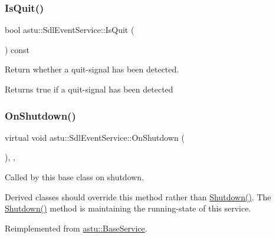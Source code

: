 \subsubsection{\texorpdfstring{Is\+Quit()}{IsQuit()}}
{\footnotesize\ttfamily bool astu\+::\+Sdl\+Event\+Service\+::\+Is\+Quit (\begin{DoxyParamCaption}{ }\end{DoxyParamCaption}) const}

Return whether a quit-\/signal has been detected.

\begin{DoxyReturn}{Returns}
{\ttfamily true} if a quit-\/signal has been detected 
\end{DoxyReturn}
\mbox{\label{classastu_1_1SdlEventService_a0163bd191605b5068d93cd6c8f26da0c}} 
\subsubsection{\texorpdfstring{On\+Shutdown()}{OnShutdown()}}
{\footnotesize\ttfamily virtual void astu\+::\+Sdl\+Event\+Service\+::\+On\+Shutdown (\begin{DoxyParamCaption}{ }\end{DoxyParamCaption})\hspace{0.3cm}{\ttfamily [override]}, {\ttfamily [protected]}, {\ttfamily [virtual]}}

Called by this base class on shutdown.

Derived classes should override this method rather than {\ttfamily \hyperlink{classastu_1_1UpdatableBaseService_a7ad7e0201007878b6014361dd5ba82f9}{Shutdown()}}. The {\ttfamily \hyperlink{classastu_1_1UpdatableBaseService_a7ad7e0201007878b6014361dd5ba82f9}{Shutdown()}} method is maintaining the running-\/state of this service. 

Reimplemented from \hyperlink{classastu_1_1BaseService_aeb5003f7c5efe5412725ac4c66942d03}{astu\+::\+Base\+Service}.

\mbox{\label{classastu_1_1SdlEventService_a71805a124600a23e48158daa5dc57fff}} 
